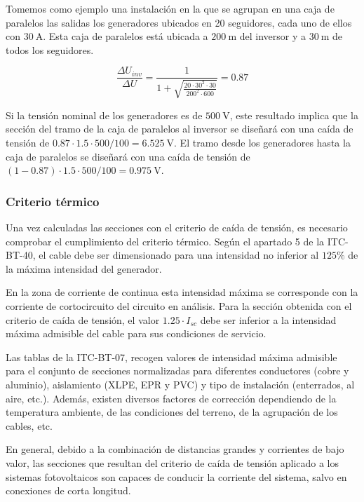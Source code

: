 Tomemos como ejemplo una instalación en la que se agrupan en una caja
de paralelos las salidas los generadores ubicados en 20 seguidores,
cada uno de ellos con $\qty{30}{\ampere}$. Esta caja de paralelos está
ubicada a $\qty{200}{\meter}$ del inversor y a $\qty{30}{\meter}$ de
todos los seguidores.

\begin{equation*}
  \frac{\Delta U_{inv}}{\Delta U} =\frac{1}{1 + \sqrt{\frac{20 \cdot 30^2 \cdot 30}{200^2 \cdot 600 }}} = \num{0.87}
\end{equation*}

Si la tensión nominal de los generadores es de $\qty{500}{\volt}$,
este resultado implica que la sección del tramo de la caja de
paralelos al inversor se diseñará con una caída de tensión de
$\num{0.87} \cdot \num{1.5} \cdot 500 /100 = \qty{6.525}{\volt}$. El
tramo desde los generadores hasta la caja de paralelos se diseñará con
una caída de tensión de
$(1 - \num{0.87}) \cdot \num{1.5} \cdot 500 /100 =
\qty{0.975}{\volt}$.

\subsubsection{Criterio térmico}
\label{sec:criterio-termico}

Una vez calculadas las secciones con el criterio de caída de tensión,
es necesario comprobar el cumplimiento del criterio térmico. Según el
apartado 5 de la ITC-BT-40, el cable debe ser dimensionado para una
intensidad no inferior al $125\%$ de la máxima intensidad del
generador.

En la zona de corriente de continua esta intensidad máxima se
corresponde con la corriente de cortocircuito del circuito en
análisis. Para la sección obtenida con el criterio de caída de
tensión, el valor $1.25 \cdot I_{sc}$ debe ser inferior a la
intensidad máxima admisible del cable para sus condiciones de
servicio.

Las tablas de la ITC-BT-07, recogen valores de intensidad máxima
admisible para el conjunto de secciones normalizadas para diferentes
conductores (cobre y aluminio), aislamiento (XLPE, EPR y PVC) y tipo
de instalación (enterrados, al aire, etc.). Además, existen diversos
factores de corrección dependiendo de la temperatura ambiente, de las
condiciones del terreno, de la agrupación de los cables, etc.

En general, debido a la combinación de distancias grandes y corrientes
de bajo valor, las secciones que resultan del criterio de caída de
tensión aplicado a los sistemas fotovoltaicos son capaces de conducir
la corriente del sistema, salvo en conexiones de corta longitud.

